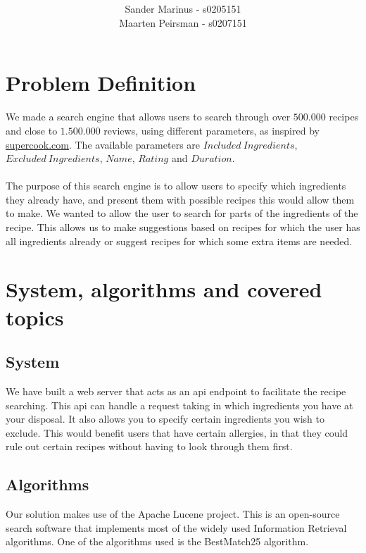 \documentclass{article}
\title{\textbf{\documentTitle}}
\author{Sander Marinus - s0205151\\Maarten Peirsman - s0207151}
\begin{document}
\maketitle

\section{Problem Definition}
We made a search engine that allows users to search through over $500.000$
recipes and close to $1.500.000$ reviews, using different parameters, as
inspired by \href{https://supercook.com}{supercook.com}.
The available parameters are $Included\ Ingredients$,
$Excluded\ Ingredients$, $Name$, $Rating$ and $Duration$.\\~\\
The purpose of this search engine is to allow users to specify which
ingredients they already have, and present them with possible recipes this
would allow them to make.
We wanted to allow the user to search for parts of the ingredients of the recipe.
This allows us to make suggestions based on recipes for which the user has all
ingredients already or suggest recipes for which some extra items are needed.

\section{System, algorithms and covered topics}
\subsection{System}
We have built a web server that acts as an api endpoint to facilitate
the recipe searching. This api can handle a request taking in which
ingredients you have at your disposal.
It also allows you to specify certain ingredients you wish to exclude.
This would benefit users that have certain allergies, in that they could
rule out certain recipes without having to look through them first.

\subsection{Algorithms}
Our solution makes use of the Apache Lucene project. This is an open-source
search software that implements most of the widely used Information Retrieval
algorithms. One of the algorithms used is the BestMatch25 algorithm.
\end{document}

